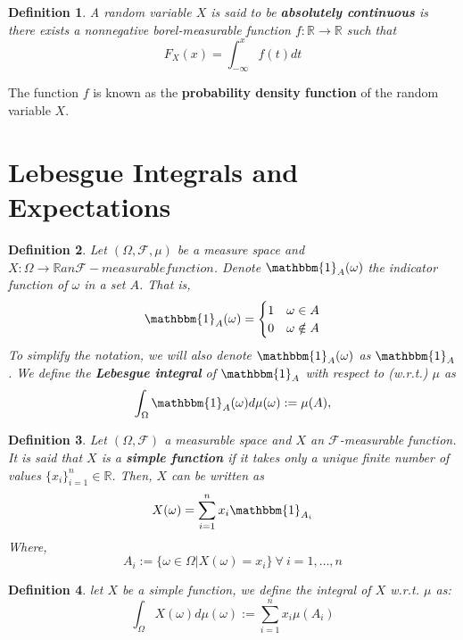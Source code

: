 \documentclass[11pt]{report}
\newtheorem{definition}{Definition}[chapter]
\newcommand{\RNums}{\mathbb{R}}
\newcommand{\ind}{\mathbbm{1}}
\newcommand{\salgF}{\mathscr{F}}
\begin{document}
\begin{definition}
	A random variable $X$ is said to be \textbf{absolutely continuous} is there exists a nonnegative borel-measurable function $f: \RNums\rightarrow\RNums$ such that 
	\begin{equation}
		F_X(x) = \int_{-\infty}^{x} f(t) dt
	\end{equation}
\end{definition}

The function $f$ is known as the \textbf{probability density function} of the random variable $X$.

\section{Lebesgue Integrals and Expectations}
\begin{definition}
	Let $(\Omega, \salgF, \mu)$ be a measure space and $X: \Omega \to \RNums an \salgF-measurable function$. Denote $\ind_A(\omega)$ the indicator function of $\omega$ in a set $A$. That is,
	\[
	\ind_A(\omega) = 
		\begin{cases}
			1 & \omega \in A \\
			0 & \omega \notin A
		\end{cases}
	\]
	To simplify the notation, we will also denote $\mathbbm{1}_A(\omega)$ as $\ind_A$.
	We define the \textbf{Lebesgue integral} of $\ind_A$ with respect to (w.r.t.) $\mu$ as
	\begin{equation}
		\int_\Omega \ind_A(\omega) d\mu(\omega) := \mu(A),
	\end{equation}
	
\end{definition}

\begin{definition}
	Let $(\Omega, \salgF)$ a measurable space and $X$ an $\salgF$-measurable function. It is said that $X$ is a \textbf{simple function} if it takes only a unique finite number of values $\{x_i\}_{i=1}^{n} \in \RNums$. Then, $X$ can be written as
	\begin{equation}
		X(\omega) = \sum_{i=1}^{n}x_i\ind_{A_i}
	\end{equation}
	Where,
	\[
		A_i := \{\omega \in \Omega | X(\omega) = x_i\} \ \forall \ i = 1, \ldots, n
	\]
\end{definition}

\begin{definition}
	let $X$ be a simple function, we define the integral of $X$ w.r.t. $\mu$ as:
	\begin{equation}
		\int_\Omega X(\omega) d\mu(\omega) := \sum_{i=1}^{n}x_i\mu(A_i)
	\end{equation}
\end{definition}
\end{document}
